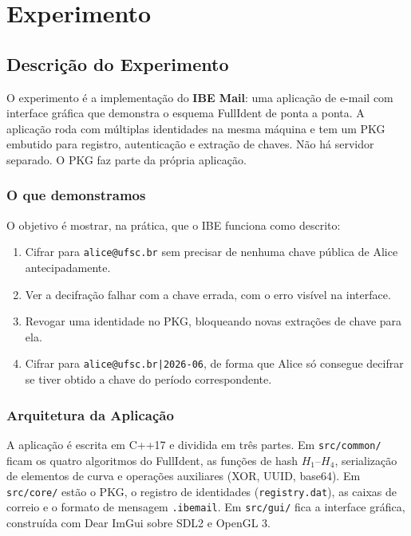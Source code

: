 \chapter{Experimento}
\label{cap:experimento}

\section{Descrição do Experimento}
\label{sec:descricao}

O experimento é a implementação do \textbf{IBE Mail}: uma aplicação de e-mail com interface
gráfica que demonstra o esquema FullIdent de ponta a ponta. A aplicação roda com múltiplas
identidades na mesma máquina e tem um PKG embutido para registro, autenticação e extração de
chaves. Não há servidor separado. O PKG faz parte da própria aplicação.

\subsection{O que demonstramos}

O objetivo é mostrar, na prática, que o IBE funciona como descrito:

\begin{enumerate}
  \item Cifrar para \texttt{alice@ufsc.br} sem precisar de nenhuma chave pública de Alice
    antecipadamente.

  \item Ver a decifração falhar com a chave errada, com o erro visível na interface.

  \item Revogar uma identidade no PKG, bloqueando novas extrações de chave para ela.

  \item Cifrar para \texttt{alice@ufsc.br|2026-06}, de forma que Alice só consegue decifrar
    se tiver obtido a chave do período correspondente.
\end{enumerate}

\subsection{Arquitetura da Aplicação}

A aplicação é escrita em C++17 e dividida em três partes. Em \texttt{src/common/} ficam os
quatro algoritmos do FullIdent, as funções de hash $H_1$--$H_4$, serialização de elementos de
curva e operações auxiliares (XOR, UUID, base64). Em \texttt{src/core/} estão o PKG,
o registro de identidades (\texttt{registry.dat}), as caixas de correio e o formato de mensagem
\texttt{.ibemail}. Em \texttt{src/gui/} fica a interface gráfica, construída com Dear ImGui
sobre SDL2 e OpenGL 3.

